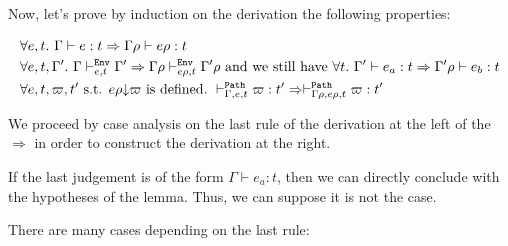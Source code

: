 \documentclass[a4paper]{article}
\theoremstyle{definition}
\begin{document}
        Now, let's prove by induction on the derivation the following properties:

        \begin{align*}
          &\forall e,t.\ \Gamma \vdash e:t \Rightarrow \Gamma\rho \vdash e\rho:t\\
          &\forall e,t,\Gamma'.\ \Gamma \vdash^{\texttt{Env}}_{e,t} \Gamma' \Rightarrow \Gamma\rho \vdash^{\texttt{Env}}_{e\rho,t} {\Gamma'}\rho
          \text{ and we still have } \forall t.\ \Gamma' \vdash e_a : t \Rightarrow \Gamma'\rho \vdash e_b:t\\
          &\forall e,t,\varpi,t' \text{ s.t. $e\rho{\downarrow}\varpi$ is defined}.\ \vdash^{\texttt{Path}}_{\Gamma,e,t} \varpi:t' \Rightarrow \vdash^{\texttt{Path}}_{\Gamma\rho,e\rho,t} \varpi:t'
        \end{align*}

        We proceed by case analysis on the last rule of the derivation at the left of the $\Rightarrow$ in order to construct the derivation at the right.
        
        If the last judgement is of the form $\Gamma \vdash e_a: t$, then we can directly conclude with the hypotheses of the lemma.
        Thus, we can suppose it is not the case.

        There are many cases depending on the last rule:
\end{document}
